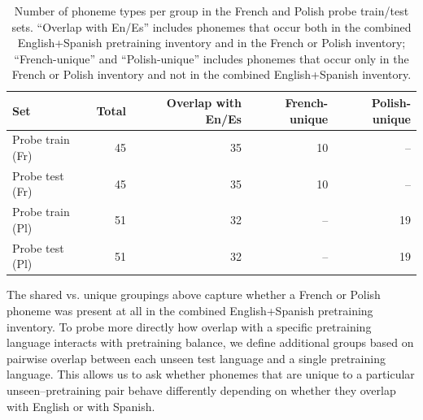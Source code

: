 \begin{table}[h]
    \centering
    \begin{tabular}{l r r r r}
        \hline
        Set & Total & Overlap with En/Es & French-unique & Polish-unique \\
        \hline
        Probe train (Fr) & 45
                         & 35  & 10  & -- \\
        Probe test (Fr)  & 45
                         & 35  & 10  & -- \\
        Probe train (Pl) & 51
                         & 32  & --  & 19 \\
        Probe test (Pl)  & 51
                         & 32  & --  & 19 \\
        \hline
    \end{tabular}
    \caption{Number of phoneme types per group in the French and Polish probe train/test sets. “Overlap with En/Es” includes phonemes that occur both in the combined English+Spanish pretraining inventory and in the French or Polish inventory; “French-unique” and “Polish-unique” includes phonemes that occur only in the French or Polish inventory and not in the combined English+Spanish inventory.}
    \label{tab:phoneme_group_sizes_fr_pl}
\end{table}


The shared vs. unique groupings above capture whether a French or Polish phoneme was present at all in the combined English+Spanish pretraining inventory. To probe more directly how overlap with a specific pretraining language interacts with pretraining balance, we define additional groups based on pairwise overlap between each unseen test language and a single pretraining language. This allows us to ask whether phonemes that are unique to a particular unseen–pretraining pair behave differently depending on whether they overlap with English or with Spanish.

